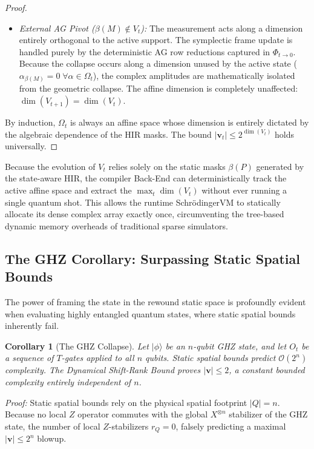 \documentclass[aps,prx,reprint,superscriptaddress,nofootinbib]{revtex4-2}
\newtheorem{corollary}[theorem]{Corollary}
\theoremstyle{definition}
\newcommand{\svm}{Schr\"odingerVM}
\begin{document}
\begin{proof}
\begin{itemize}[leftmargin=*]
\begin{itemize}
        \item \textit{External AG Pivot ($\beta(M) \notin V_t$):} The measurement acts along a dimension entirely orthogonal to the active support. The symplectic frame update is handled purely by the deterministic AG row reductions captured in $\Phi_{t \to 0}$. Because the collapse occurs along a dimension unused by the active state ($\alpha_{\beta(M)} = 0 \;\forall \alpha \in \Omega_t$), the complex amplitudes are mathematically isolated from the geometric collapse. The affine dimension is completely unaffected: $\dim(V_{t+1}) = \dim(V_t)$.
    \end{itemize}
\end{itemize}
By induction, $\Omega_t$ is always an affine space whose dimension is entirely dictated by the algebraic dependence of the HIR masks. The bound $|\mathbf{v}_t| \le 2^{\dim(V_t)}$ holds universally.
\end{proof}

Because the evolution of $V_t$ relies solely on the static masks $\beta(P)$ generated by the state-aware HIR, the compiler Back-End can deterministically track the active affine space and extract the $\max_t \dim(V_t)$ without ever running a single quantum shot. This allows the runtime \svm{} to statically allocate its dense complex array exactly once, circumventing the tree-based dynamic memory overheads of traditional sparse simulators.

\subsection{The GHZ Corollary: Surpassing Static Spatial Bounds}

The power of framing the state in the rewound static space is profoundly evident when evaluating highly entangled quantum states, where static spatial bounds inherently fail.

\begin{corollary}[The GHZ Collapse]
\label{cor:ghz}
Let $|\phi\rangle$ be an $n$-qubit GHZ state, and let $O_t$ be a sequence of $T$-gates applied to all $n$ qubits. Static spatial bounds predict $\mathcal{O}(2^n)$ complexity. The Dynamical Shift-Rank Bound proves $|\mathbf{v}| \le 2$, a constant bounded complexity entirely independent of $n$.
\end{corollary}

\textit{Proof:} Static spatial bounds rely on the physical spatial footprint $|Q| = n$. Because no local $Z$ operator commutes with the global $X^{\otimes n}$ stabilizer of the GHZ state, the number of local $Z$-stabilizers $r_Q = 0$, falsely predicting a maximal $|\mathbf{v}| \le 2^n$ blowup.
\end{document}
